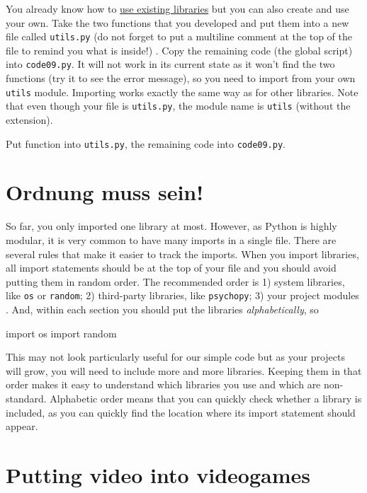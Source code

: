 \documentclass[
]{book}
\newenvironment{Shaded}{\begin{snugshade}}{\end{snugshade}}
\newcommand{\ImportTok}[1]{#1}
\newcommand{\NormalTok}[1]{#1}
\begin{document}
You already know how to \protect\hyperlink{using-libraries}{use existing libraries} but you can also create and use your own. Take the two functions that you developed and put them into a new file called \texttt{utils.py} (do not forget to put a multiline comment at the top of the file to remind you what is inside!) . Copy the remaining code (the global script) into \texttt{code09.py}. It will not work in its current state as it won't find the two functions (try it to see the error message), so you need to import from your own \texttt{utils} module. Importing works exactly the same way as for other libraries. Note that even though your file is \texttt{utils.py}, the module name is \texttt{utils} (without the extension).

Put function into \texttt{utils.py}, the remaining code into \texttt{code09.py}.

\hypertarget{keep-imports-tidy}{%
\section{Ordnung muss sein!}\label{keep-imports-tidy}}

So far, you only imported one library at most. However, as Python is highly modular, it is very common to have many imports in a single file. There are several rules that make it easier to track the imports. When you import libraries, all import statements should be at the top of your file and you should avoid putting them in random order. The recommended order is 1) system libraries, like \texttt{os} or \texttt{random}; 2) third-party libraries, like \texttt{psychopy}; 3) your project modules . And, within each section you should put the libraries \emph{alphabetically}, so

\begin{Shaded}
\begin{Highlighting}[]
\ImportTok{import}\NormalTok{ os}
\ImportTok{import}\NormalTok{ random}
\end{Highlighting}
\end{Shaded}

This may not look particularly useful for our simple code but as your projects will grow, you will need to include more and more libraries. Keeping them in that order makes it easy to understand which libraries you use and which are non-standard. Alphabetic order means that you can quickly check whether a library is included, as you can quickly find the location where its import statement should appear.

\hypertarget{putting-video-into-videogames}{%
\section{Putting video into videogames}\label{putting-video-into-videogames}}
\end{document}
